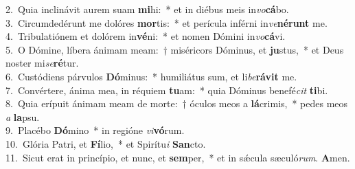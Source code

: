 {2.~}Quia inclinávit aurem suam \textbf{mi}hi:~* et in diébus meis in\textit{vo}\textbf{cá}bo.\\
{3.~}Circumdedérunt me dolóres \textbf{mor}tis:~* et perícula inférni in\textit{ve}\textbf{né}\textbf{runt} me.\\
{4.~}Tribulatiónem et dolórem in\textbf{vé}ni:~* et nomen Dómini in\textit{vo}\textbf{cá}vi.\\
{5.~}O Dómine, líbera ánimam meam:~† miséricors Dóminus, et \textbf{ju}stus,~* et Deus noster mi\textit{se}\textbf{ré}tur.\\
{6.~}Custódiens párvulos \textbf{Dó}minus:~* humiliátus sum, et li\textit{be}\textbf{rá}\textbf{vit} me.\\
{7.~}Convértere, ánima mea, in réquiem \textbf{tu}am:~* quia Dóminus benefé\textit{cit} \textbf{ti}bi.\\
{8.~}Quia erípuit ánimam meam de morte:~† óculos meos a \textbf{lá}crimis,~* pedes meos \textit{a} \textbf{la}psu.\\
{9.~}Placébo \textbf{Dó}mino~* in regióne \textit{vi}\textbf{vó}rum.\\
{10.~}Glória Patri, et \textbf{Fí}lio,~* et Spirítu\textit{i} \textbf{San}cto.\\
{11.~}Sicut erat in princípio, et nunc, et \textbf{sem}per,~* et in sǽcula sæculó\textit{rum}. \textbf{A}men.\\
